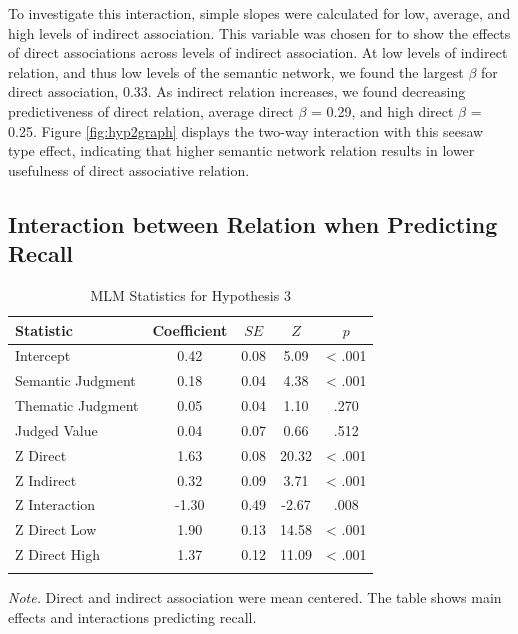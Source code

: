 \documentclass[english,,man]{apa6}
\begin{document}
To investigate this interaction, simple slopes were calculated for low, average, and high levels of indirect association. This variable was chosen for to show the effects of direct associations across levels of indirect association. At low levels of indirect relation, and thus low levels of the semantic network, we found the largest \(\beta\) for direct association, 0.33. As indirect relation increases, we found decreasing predictiveness of direct relation, average direct \(\beta\) = 0.29, and high direct \(\beta\) = 0.25. Figure \ref{fig:hyp2graph} displays the two-way interaction with this seesaw type effect, indicating that higher semantic network relation results in lower usefulness of direct associative relation.

\hypertarget{interaction-between-relation-when-predicting-recall}{%
\subsection{Interaction between Relation when Predicting Recall}\label{interaction-between-relation-when-predicting-recall}}

\begin{table}[tbp]
\begin{center}
\begin{threeparttable}
\caption{\label{tab:hyp3-table}MLM Statistics for Hypothesis 3}
\begin{tabular}{lcccc}
\toprule
Statistic & \multicolumn{1}{c}{Coefficient} & \multicolumn{1}{c}{$SE$} & \multicolumn{1}{c}{$Z$} & \multicolumn{1}{c}{$p$}\\
\midrule
Intercept & 0.42 & 0.08 & 5.09 & < .001\\
Semantic Judgment & 0.18 & 0.04 & 4.38 & < .001\\
Thematic Judgment & 0.05 & 0.04 & 1.10 & .270\\
Judged Value & 0.04 & 0.07 & 0.66 & .512\\
Z Direct & 1.63 & 0.08 & 20.32 & < .001\\
Z Indirect & 0.32 & 0.09 & 3.71 & < .001\\
Z Interaction & -1.30 & 0.49 & -2.67 & .008\\
Z Direct Low & 1.90 & 0.13 & 14.58 & < .001\\
Z Direct High & 1.37 & 0.12 & 11.09 & < .001\\
\bottomrule
\addlinespace
\end{tabular}
\begin{tablenotes}[para]
\normalsize{\textit{Note.} Direct and indirect association  were mean centered. The table shows main effects and interactions predicting recall.}
\end{tablenotes}
\end{threeparttable}
\end{center}
\end{table}
\end{document}
